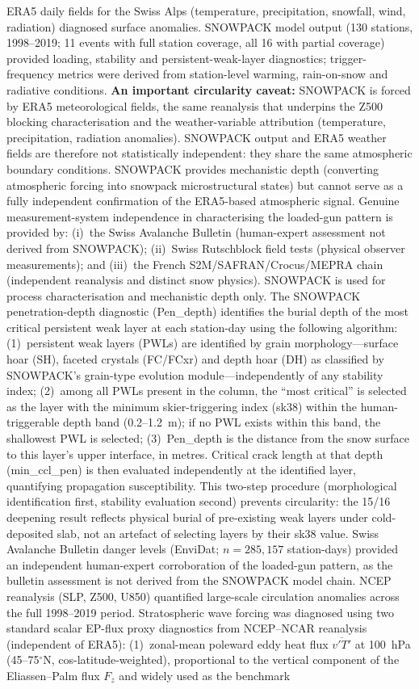 \documentclass[11pt,letterpaper]{article}
\begin{document}
ERA5 daily fields for the Swiss Alps (temperature, precipitation, snowfall, wind, radiation) diagnosed surface anomalies. SNOWPACK model output (130 stations, 1998--2019; 11 events with full station coverage, all 16 with partial coverage) provided loading, stability and persistent-weak-layer diagnostics; trigger-frequency metrics were derived from station-level warming, rain-on-snow and radiative conditions. \textbf{An important circularity caveat:} SNOWPACK is forced by ERA5 meteorological fields, the same reanalysis that underpins the Z500 blocking characterisation and the weather-variable attribution (temperature, precipitation, radiation anomalies). SNOWPACK output and ERA5 weather fields are therefore not statistically independent: they share the same atmospheric boundary conditions. SNOWPACK provides mechanistic depth (converting atmospheric forcing into snowpack microstructural states) but cannot serve as a fully independent confirmation of the ERA5-based atmospheric signal. Genuine measurement-system independence in characterising the loaded-gun pattern is provided by: (i)~the Swiss Avalanche Bulletin (human-expert assessment not derived from SNOWPACK); (ii)~Swiss Rutschblock field tests (physical observer measurements); and (iii)~the French S2M/SAFRAN/Crocus/MEPRA chain (independent reanalysis and distinct snow physics). SNOWPACK is used for process characterisation and mechanistic depth only. The SNOWPACK penetration-depth diagnostic (Pen\_depth) identifies the burial depth of the most critical persistent weak layer at each station-day using the following algorithm: (1)~persistent weak layers (PWLs) are identified by grain morphology---surface hoar (SH), faceted crystals (FC/FCxr) and depth hoar (DH) as classified by SNOWPACK's grain-type evolution module\cite{Lehning2002}---independently of any stability index; (2)~among all PWLs present in the column, the ``most critical'' is selected as the layer with the minimum skier-triggering index (sk38) within the human-triggerable depth band (0.2--1.2~m); if no PWL exists within this band, the shallowest PWL is selected; (3)~Pen\_depth is the distance from the snow surface to this layer's upper interface, in metres. Critical crack length at that depth (min\_ccl\_pen) is then evaluated independently at the identified layer, quantifying propagation susceptibility. This two-step procedure (morphological identification first, stability evaluation second) prevents circularity: the 15/16 deepening result reflects physical burial of pre-existing weak layers under cold-deposited slab, not an artefact of selecting layers by their sk38 value. Swiss Avalanche Bulletin danger levels (EnviDat; $n = 285{,}157$ station-days) provided an independent human-expert corroboration of the loaded-gun pattern, as the bulletin assessment is not derived from the SNOWPACK model chain. NCEP reanalysis (SLP, Z500, U850) quantified large-scale circulation anomalies across the full 1998--2019 period. Stratospheric wave forcing was diagnosed using two standard scalar EP-flux proxy diagnostics from NCEP--NCAR reanalysis (independent of ERA5): (1)~zonal-mean poleward eddy heat flux $\overline{v'T'}$ at 100~hPa (45--75$^\circ$N, cos-latitude-weighted), proportional to the vertical component of the Eliassen--Palm flux $F_z$ and widely used as the benchmark 
\end{document}
